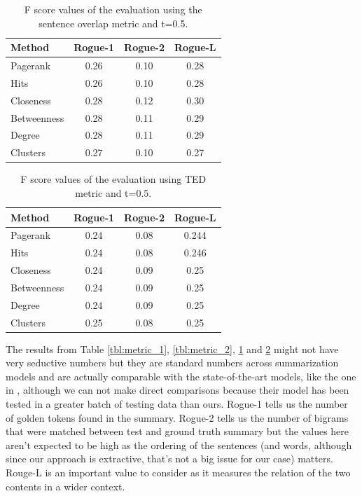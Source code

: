 \documentclass[9pt,twocolumn,twoside]{pnas-report}
\begin{document}
\begin{table}[t]\centering%
	\caption{F score values of the evaluation using the sentence overlap metric and t=0.5.}
	\begin{tabular}{lccc}\toprule
	   	\textbf{Method} & \textbf{Rogue-1} & \textbf{Rogue-2} & \textbf{Rogue-L}\\
		\midrule
		Pagerank & 0.26 & 0.10 & 0.28 \\
		\midrule
		Hits & 0.26 & 0.10 & 0.28 \\
		\midrule
		Closeness & 0.28 & 0.12 & 0.30 \\ 
		\midrule
		Betweenness & 0.28 & 0.11 & 0.29 \\
		\midrule
		Degree & 0.28 & 0.11 & 0.29 \\
		\midrule
		Clusters & 0.27 & 0.10 & 0.27 \\
		\bottomrule

	\end{tabular}
	\label{tbl:metric_1_fscore}
\end{table}

\begin{table}[t]\centering%
	\caption{F score values of the evaluation using TED metric and t=0.5.}
	\begin{tabular}{lccc}\toprule
	   	\textbf{Method} & \textbf{Rogue-1} & \textbf{Rogue-2} & \textbf{Rogue-L}\\
		\midrule
		Pagerank & 0.24 & 0.08 & 0.244 \\
		\midrule
		Hits & 0.24 & 0.08 & 0.246 \\
		\midrule
		Closeness & 0.24 & 0.09 & 0.25 \\ 
		\midrule
		Betweenness & 0.24 & 0.09 & 0.25 \\
		\midrule
		Degree & 0.24 & 0.09 & 0.25 \\
		\midrule
		Clusters & 0.25 & 0.08 & 0.25 \\
		\bottomrule

	\end{tabular}
	\label{tbl:metric_2_fscore}
\end{table}
The results from Table \ref{tbl:metric_1}, \ref{tbl:metric_2}, \ref{tbl:metric_1_fscore} and \ref{tbl:metric_2_fscore} might not have very seductive numbers but they are standard numbers across summarization models and are actually comparable with the state-of-the-art models, like the one in \cite{YW}, although we can not make direct comparisons because their model has been tested in a greater batch of testing data than ours. 
Rogue-1 tells us the number of golden tokens found in the summary. Rogue-2 tells us the number of bigrams that were matched between test and ground truth summary but the values here aren't expected to be high as the ordering of the sentences (and words, although since our approach is extractive, that's not a big issue for our case) matters. Rouge-L is an important value to consider as it measures the relation of the two contents in a wider context.
\end{document}
